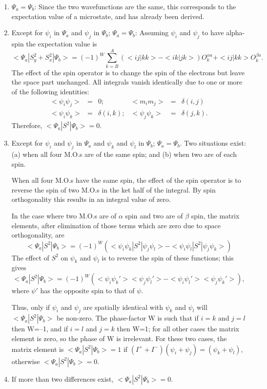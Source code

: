 \begin{enumerate}
\item $\Psi_a=\Psi_b$: Since the two wavefunctions are the same, this
corresponds to the expectation value of a microstate, and has already been
derived.

\item Except for $\psi_i$ in $\Psi_a$ and $\psi_j$ in $\Psi_b$; $\Psi_a
=\Psi_b$:  Assuming $\psi_i$ and $\psi_j$ to have alpha-spin the expectation
value is
$$
<\Psi_a|S_y^2+S_x^2|\Psi_b>=
 (-1)^W\sum_{k=B}^A(<ij|kk>-<ik|jk>)O_k^{\alpha a}
+<ij|kk>O_k^{\beta a}.
$$
The effect of the spin operator is to change the spin of the electrons but
leave the space part unchanged. All integrals vanish identically due to one or
more of the following identities:
$$
\begin{array}{rclrcl}
<\psi_i\psi_j>&=&0;&<m_im_j>&=&\delta(i,j)\\
<\psi_i\psi_k>&=&\delta(i,k);&<\psi_j\psi_k>&=&\delta(j,k).
\end{array}
$$
Therefore, $<\Psi_a|S^2|\Psi_b>=0$.

\item Except for $\psi_i$ and $\psi_j$ in $\Psi_a$ and $\psi_k$  and $\psi_l$
in $\Psi_b$; $\Psi_a = \Psi_b$. Two situations exist: (a) when all four M.O.s
are of the same spin; and (b) when two are of each spin.

When all four M.O.s have the same spin, the effect of the spin operator is to
reverse the spin of two M.O.s in the ket half of the integral. By spin
orthogonality this results in an integral value of zero.

In the case where two M.O.s are of $\alpha$ spin and two are of $\beta$ spin,
the matrix elements, after elimination of those terms which are zero due to
space orthogonality, are
$$
<\Psi_a|S^2|\Psi_b> = (-1)^W(<\psi_i\psi_k|S^2|\psi_j\psi_l>-
<\psi_i\psi_l|S^2|\psi_j\psi_k>)
$$
The effect of $S^2$ on $\psi_k$ and $\psi_l$ is to reverse the spin of these
functions; this gives
$$
<\Psi_a|S^2|\Psi_b> = (-1)^W(<\psi_i\psi_k'><\psi_j\psi_l'>-
<\psi_i\psi_l'><\psi_j\psi_k'>) ,
$$
where $\psi'$ has the opposite spin to that of $\psi$.

Thus, only if $\psi_i$ and $\psi_j$ are spatially identical with $\psi_k$ and
$\psi_l$ will $<\Psi_a|S^2|\Psi_b >$ be non-zero. The phase-factor W is such
that if $i=k$ and $j=l$ then W=--1, and if $i=l$ and $j=k$ then W=1; for all
other cases the matrix element is zero, so the phase of W is irrelevant. For
these two cases, the matrix element is $ <\Psi_a|S^2|\Psi_b>=1$ if
$(I^++I^-)(\psi_i+\psi_j)=(\psi_k+\psi_l)$, otherwise $<\Psi_a|S^2|\Psi_b> =
0$.

\item If more than two differences exist, $<\Psi_a|S^2|\Psi_b> = 0$.
\end{enumerate}


